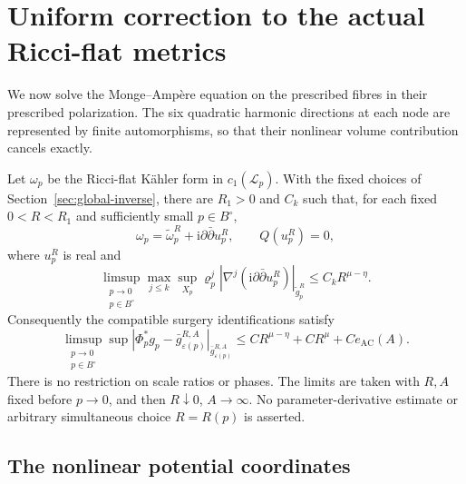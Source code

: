 \section{Uniform correction to the actual Ricci-flat metrics}
\label{sec:ricci-flat}

We now solve the Monge--Ampère equation on the prescribed fibres
in their prescribed polarization. The six quadratic harmonic
directions at each node are represented by finite automorphisms,
so that their nonlinear volume contribution cancels exactly.

\begin{theorem}\label{thm:ricci-flat-comparison}
Let $\omega_p$ be the Ricci-flat Kähler form in $c_1(\mathcal L_p)$.
With the fixed choices of Section~\ref{sec:global-inverse}, there
are $R_1>0$ and $C_k$ such that, for each fixed $0<R<R_1$
and sufficiently small $p\in B^\circ$,
\[
 \omega_p=\widetilde\omega_p^R
                     +\mathrm i\partial\bar\partial u_p^R,
 \qquad Q(u_p^R)=0,
\]
where $u_p^R$ is real and
\begin{equation}\label{eq:actual-potential-bound}
 \limsup_{\substack{p\to0\\p\in B^\circ}}
 \max_{j\le k}\sup_{X_p}\varrho_p^j
 |\nabla^j(\mathrm i\partial\bar\partial u_p^R)|
                  _{\widetilde g_p^R}
       \le C_kR^{\mu-\eta}.
\end{equation}
Consequently the compatible surgery identifications satisfy
\begin{equation}\label{eq:actual-model-comparison}
 \limsup_{\substack{p\to0\\p\in B^\circ}}\sup
 |\Phi_p^*g_p-\bar g_{\varepsilon(p)}^{R,A}|
                   _{\bar g_{\varepsilon(p)}^{R,A}}
 \le C R^{\mu-\eta}+CR^\mu+C e_{\mathrm{AC}}(A).
\end{equation}
There is no restriction on scale ratios or phases. The limits
are taken with $R,A$ fixed before $p\to0$, and then
$R\downarrow0$, $A\to\infty$. No parameter-derivative estimate
or arbitrary simultaneous choice $R=R(p)$ is asserted.
\end{theorem}

\subsection{The nonlinear potential coordinates}


